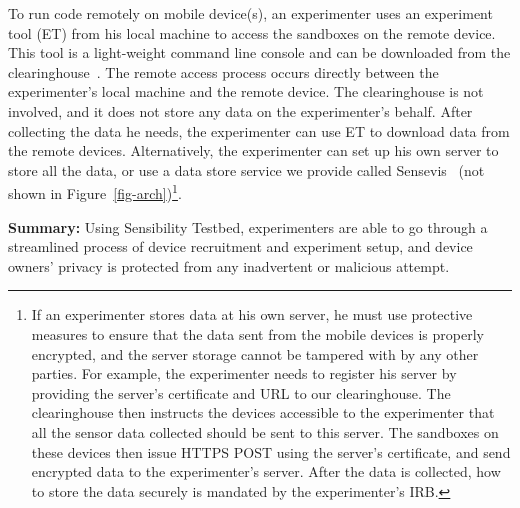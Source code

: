 To run code remotely on mobile device(s), an experimenter uses an
experiment tool (ET) from his local machine 
to access the sandboxes on the remote device. This tool is a 
light-weight command line console and can
be downloaded from the clearinghouse~\cite{demo-kit}.
The remote access process
occurs directly between the experimenter's local machine and the 
remote device. The clearinghouse is not involved, and it does not store any
data on the experimenter's behalf. After collecting the data he needs, the
experimenter can use ET to download data from the remote devices. 
Alternatively, the experimenter can set up his own server to store all 
the data, or use a data store service we provide called Sensevis~\cite{sensevis} 
(not shown in Figure~\ref{fig-arch})\footnote{
If an experimenter stores data at his own server, he must use protective
measures to ensure that the data sent from the mobile devices is
properly encrypted, and the server storage cannot be tampered
with by any other parties. For example, the experimenter needs to register
his server by providing the server's certificate and URL to our
clearinghouse. The clearinghouse then instructs the devices
accessible to the experimenter that all the sensor data collected should be
sent to this server. The sandboxes on these devices then issue
HTTPS POST using the server's certificate, and send encrypted
data to the experimenter's server. After the data is collected, how to store
the data securely is mandated by the experimenter's IRB.}.

\smallskip
\textbf{Summary:}
%
%
Using Sensibility Testbed, experimenters are able to go 
through a streamlined process of device recruitment and 
experiment setup, and device owners' privacy is protected
from any inadvertent or malicious attempt.

